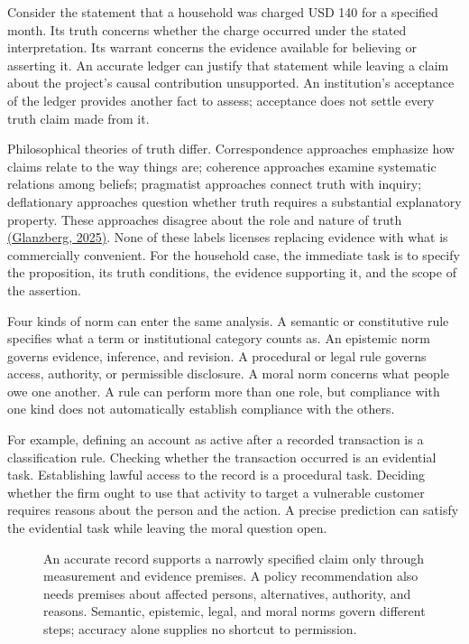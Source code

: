 \noindent \noindent Consider the statement that a household was charged USD 140
for a specified month. Its truth concerns whether the charge occurred
under the stated interpretation. Its warrant concerns the evidence
available for believing or asserting it. An accurate ledger can justify
that statement while leaving a claim about the project's causal
contribution unsupported. An institution's acceptance of the ledger
provides another fact to assess; acceptance does not settle every truth
claim made from it.

Philosophical theories of truth differ. Correspondence approaches
emphasize how claims relate to the way things are; coherence approaches
examine systematic relations among beliefs; pragmatist approaches
connect truth with inquiry; deflationary approaches question whether
truth requires a substantial explanatory property. These approaches
disagree about the role and nature of truth
\href{https://plato.stanford.edu/entries/truth/}{(Glanzberg, 2025)}.
None of these labels licenses replacing evidence with what is
commercially convenient. For the household case, the immediate task is
to specify the proposition, its truth conditions, the evidence
supporting it, and the scope of the assertion.

Four kinds of norm can enter the same analysis. A semantic or
constitutive rule specifies what a term or institutional category counts
as. An epistemic norm governs evidence, inference, and revision. A
procedural or legal rule governs access, authority, or permissible
disclosure. A moral norm concerns what people owe one another. A rule
can perform more than one role, but compliance with one kind does not
automatically establish compliance with the others.

For example, defining an account as active after a recorded transaction
is a classification rule. Checking whether the transaction occurred is
an evidential task. Establishing lawful access to the record is a
procedural task. Deciding whether the firm ought to use that activity to
target a vulnerable customer requires reasons about the person and the
action. A precise prediction can satisfy the evidential task while
leaving the moral question open.

\begin{figure}[htbp]
\centering

\caption{An accurate record supports a narrowly specified claim only through measurement and evidence premises. A policy recommendation also needs premises about affected persons, alternatives, authority, and reasons. Semantic, epistemic, legal, and moral norms govern different steps; accuracy alone supplies no shortcut to permission.}\label{fig:M09_truth_and_norms}
\end{figure}

